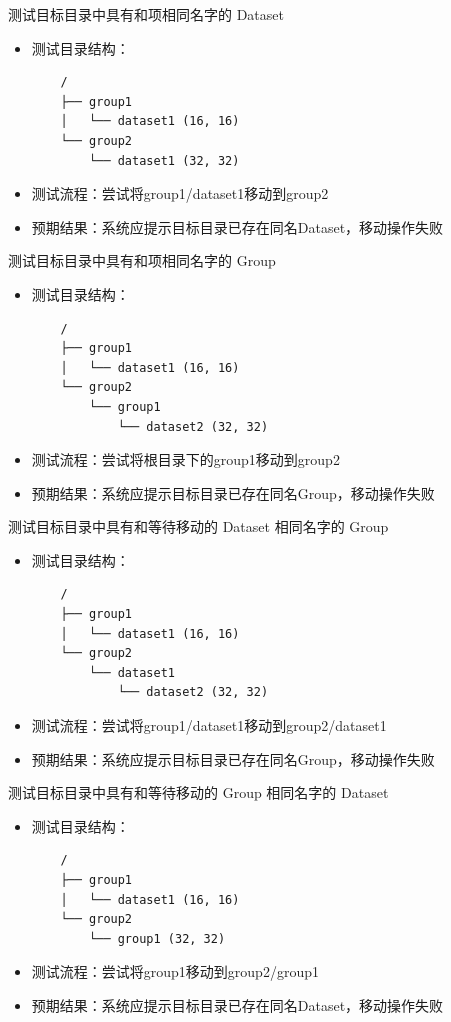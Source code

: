 \documentclass[a4paper,12pt]{report}	%
\begin{document}
测试目标目录中具有和项相同名字的 Dataset 
\begin{itemize}
    \item 测试目录结构：
    \begin{verbatim}
    /
    ├── group1
    │   └── dataset1 (16, 16)
    └── group2
        └── dataset1 (32, 32)
    \end{verbatim}
    \item 测试流程：尝试将group1/dataset1移动到group2
    \item 预期结果：系统应提示目标目录已存在同名Dataset，移动操作失败
\end{itemize}

测试目标目录中具有和项相同名字的 Group 
\begin{itemize}
    \item 测试目录结构：
    \begin{verbatim}
    /
    ├── group1
    │   └── dataset1 (16, 16)
    └── group2
        └── group1
            └── dataset2 (32, 32)
    \end{verbatim}
    \item 测试流程：尝试将根目录下的group1移动到group2
    \item 预期结果：系统应提示目标目录已存在同名Group，移动操作失败
\end{itemize}

测试目标目录中具有和等待移动的 Dataset 相同名字的 Group 
\begin{itemize}
    \item 测试目录结构：
    \begin{verbatim}
    /
    ├── group1
    │   └── dataset1 (16, 16)
    └── group2
        └── dataset1
            └── dataset2 (32, 32)
    \end{verbatim}
    \item 测试流程：尝试将group1/dataset1移动到group2/dataset1
    \item 预期结果：系统应提示目标目录已存在同名Group，移动操作失败
\end{itemize}

测试目标目录中具有和等待移动的 Group 相同名字的 Dataset 
\begin{itemize}
    \item 测试目录结构：
    \begin{verbatim}
    /
    ├── group1
    │   └── dataset1 (16, 16)
    └── group2
        └── group1 (32, 32)
    \end{verbatim}
    \item 测试流程：尝试将group1移动到group2/group1
    \item 预期结果：系统应提示目标目录已存在同名Dataset，移动操作失败
\end{itemize}
\end{document}
